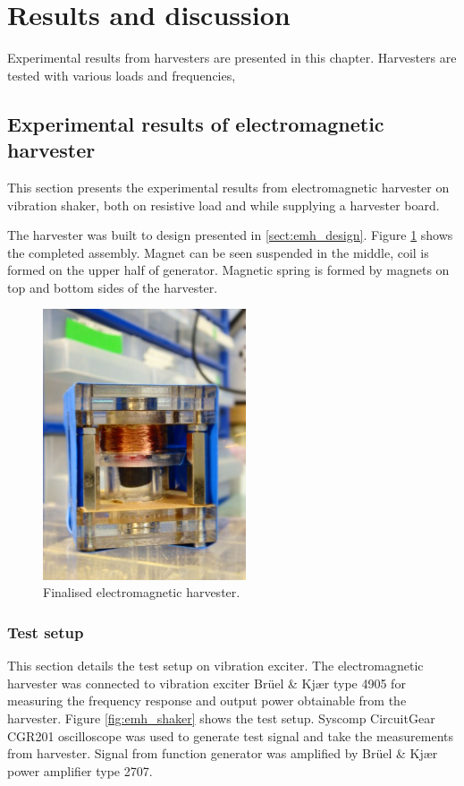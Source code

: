 \section{Results and discussion}
Experimental results from harvesters are presented in this chapter. Harvesters are tested with various loads and frequencies, 

\subsection{Experimental results of electromagnetic harvester}
This section presents the experimental results from electromagnetic harvester on vibration shaker, both on resistive load and while supplying a harvester board. 

The harvester was built to design presented in \ref{sect:emh_design}. Figure \ref{fig:emh_final} shows the completed assembly. Magnet can be seen suspended in the middle, coil is formed on the upper half of generator. Magnetic spring is formed by magnets on top and bottom sides of the harvester. 

\begin{figure}[htb]
\begin{center}
\includegraphics[height=8cm]{images/own_pic/inductive_harvester.jpg}
\end{center}
\caption{\label{fig:emh_final} Finalised electromagnetic harvester.}
\end{figure}


\subsubsection{Test setup} \label{sect:lg_test_setup}
This section details the test setup on vibration exciter. The electromagnetic harvester was connected to vibration exciter Brüel \& Kjær type 4905 for measuring the frequency response and output power obtainable from the harvester. Figure \ref{fig:emh_shaker} shows the test setup. Syscomp CircuitGear CGR201 oscilloscope was used to generate test signal and take the measurements from harvester. Signal from function generator was amplified by Brüel \& Kjær power amplifier type 2707.

